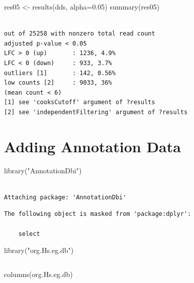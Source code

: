 \documentclass[
  letterpaper,
  DIV=11,
  numbers=noendperiod]{scrartcl}
\newenvironment{Shaded}{\begin{snugshade}}{\end{snugshade}}
\newcommand{\AttributeTok}[1]{\textcolor[rgb]{0.40,0.45,0.13}{#1}}
\newcommand{\FloatTok}[1]{\textcolor[rgb]{0.68,0.00,0.00}{#1}}
\newcommand{\FunctionTok}[1]{\textcolor[rgb]{0.28,0.35,0.67}{#1}}
\newcommand{\NormalTok}[1]{\textcolor[rgb]{0.00,0.23,0.31}{#1}}
\newcommand{\OtherTok}[1]{\textcolor[rgb]{0.00,0.23,0.31}{#1}}
\newcommand{\StringTok}[1]{\textcolor[rgb]{0.13,0.47,0.30}{#1}}
\begin{document}
\begin{Shaded}
\begin{Highlighting}[]
\NormalTok{res05 }\OtherTok{\textless{}{-}} \FunctionTok{results}\NormalTok{(dds, }\AttributeTok{alpha=}\FloatTok{0.05}\NormalTok{)}
\FunctionTok{summary}\NormalTok{(res05)}
\end{Highlighting}
\end{Shaded}

\begin{verbatim}

out of 25258 with nonzero total read count
adjusted p-value < 0.05
LFC > 0 (up)       : 1236, 4.9%
LFC < 0 (down)     : 933, 3.7%
outliers [1]       : 142, 0.56%
low counts [2]     : 9033, 36%
(mean count < 6)
[1] see 'cooksCutoff' argument of ?results
[2] see 'independentFiltering' argument of ?results
\end{verbatim}

\hypertarget{adding-annotation-data}{%
\section{Adding Annotation Data}\label{adding-annotation-data}}

\begin{Shaded}
\begin{Highlighting}[]
\FunctionTok{library}\NormalTok{(}\StringTok{"AnnotationDbi"}\NormalTok{)}
\end{Highlighting}
\end{Shaded}

\begin{verbatim}

Attaching package: 'AnnotationDbi'
\end{verbatim}

\begin{verbatim}
The following object is masked from 'package:dplyr':

    select
\end{verbatim}

\begin{Shaded}
\begin{Highlighting}[]
\FunctionTok{library}\NormalTok{(}\StringTok{"org.Hs.eg.db"}\NormalTok{)}
\end{Highlighting}
\end{Shaded}

\begin{verbatim}
\end{verbatim}

\begin{Shaded}
\begin{Highlighting}[]
\FunctionTok{columns}\NormalTok{(org.Hs.eg.db)}
\end{Highlighting}
\end{Shaded}
\end{document}
